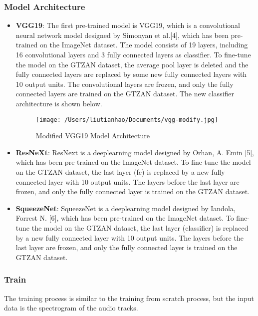\documentclass{article}
\begin{document}
\subsubsection{Model Architecture}
\begin{itemize}
    \item \textbf{VGG19}:
    The first pre-trained model is VGG19, which is a convolutional neural network model designed by Simonyan et al.[4], which has been pre-trained on the ImageNet dataset.
    The model consists of 19 layers, including 16 convolutional layers and 3 fully connected layers as classifier. 
    To fine-tune the model on the GTZAN dataset, the average pool layer is deleted and the fully connected layers are replaced by some new fully connected layers with 10 output units.
    The convolutional layers are frozen, and only the fully connected layers are trained on the GTZAN dataset. The new classifier architecture is shown below.

    \begin{figure}[ht!]
      \centering
      \texttt{[image: /Users/liutianhao/Documents/vgg-modify.jpg]}
      \caption{Modified VGG19 Model Architecture}
    \end{figure}

    \item \textbf{ResNeXt}:
    ResNext is a deeplearning model designed by Orhan, A. Emin [5], which has been pre-trained on the ImageNet dataset.
    To fine-tune the model on the GTZAN dataset, the last layer (fc) is replaced by a new fully connected layer with 10 output units.
    The layers before the last layer are frozen, and only the fully connected layer is trained on the GTZAN dataset.
    
    \item \textbf{SqueezeNet}:
    SqueezeNet is a deeplearning model designed by Iandola, Forrest N. [6], which has been pre-trained on the ImageNet dataset.
    To fine-tune the model on the GTZAN dataset, the last layer (classifier) is replaced by a new fully connected layer with 10 output units.
    The layers before the last layer are frozen, and only the fully connected layer is trained on the GTZAN dataset.

\end{itemize}


\subsubsection{Train}
The training process is similar to the training from scratch process, but the input data is the spectrogram of the audio tracks.
\end{document}
